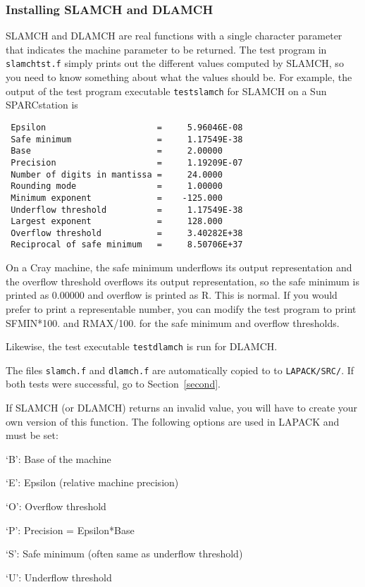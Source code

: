 \subsubsection{Installing SLAMCH and DLAMCH}
\dent
SLAMCH and DLAMCH are real functions with a single character parameter
that indicates the machine parameter to be returned.  The test 
program in {\tt slamchtst.f}
simply prints out the different values computed by SLAMCH,
so you need to know something about what the values should be. 
For example, the output of the test program executable {\tt testslamch}
for SLAMCH on a Sun SPARCstation is
\begin{verbatim}
 Epsilon                      =     5.96046E-08
 Safe minimum                 =     1.17549E-38
 Base                         =     2.00000
 Precision                    =     1.19209E-07
 Number of digits in mantissa =     24.0000
 Rounding mode                =     1.00000
 Minimum exponent             =    -125.000
 Underflow threshold          =     1.17549E-38
 Largest exponent             =     128.000
 Overflow threshold           =     3.40282E+38
 Reciprocal of safe minimum   =     8.50706E+37
\end{verbatim}
On a Cray machine, the safe minimum underflows its output
representation and the overflow threshold overflows its output
representation, so the safe minimum is printed as 0.00000 and overflow
is printed as R.  This is normal.
If you would prefer to print a representable number, you can modify
the test program to print SFMIN*100. and RMAX/100. for the safe
minimum and overflow thresholds.

Likewise, the test executable {\tt testdlamch} is run for DLAMCH.

The files {\tt slamch.f} and {\tt dlamch.f} are automatically copied to
to {\tt LAPACK/SRC/}.
If both tests were successful, go to Section~\ref{second}.

If SLAMCH (or DLAMCH) returns an invalid value, you will have to create
your own version of this function.  The following options are used in
LAPACK and must be set:

\begin{list}{}{}
\item {`B': }  Base of the machine
\item {`E': }  Epsilon (relative machine precision)
\item {`O': }  Overflow threshold
\item {`P': }  Precision = Epsilon*Base
\item {`S': }  Safe minimum (often same as underflow threshold)
\item {`U': }  Underflow threshold
\end{list}

